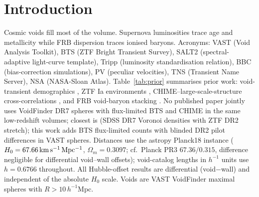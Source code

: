 \section{Introduction}
Cosmic voids fill most of the volume. Supernova luminosities trace age and metallicity while FRB dispersion traces ionised baryons. Acronyms: VAST (Void Analysis Toolkit), BTS (ZTF Bright Transient Survey), SALT2 (spectral-adaptive light-curve template), Tripp (luminosity standardisation relation), BBC (bias-correction simulations), PV (peculiar velocities), TNS (Transient Name Server), NSA (NASA-Sloan Atlas). Table~\ref{tab:prior} summarises prior work: void-transient demographics \citep{wang26,tsaprazi21}, ZTF Ia environments \citep{aubert25}, CHIME--large-scale-structure cross-correlations \citep{chime21}, and FRB void-baryon stacking \citep{sharma26}. No published paper jointly uses VoidFinder DR7 spheres \citep{douglass23} with flux-limited BTS \citep{perley20,fremling19} and CHIME in the same low-redshift volumes; closest is \citet{aubert25} (SDSS DR7 Voronoi densities with ZTF DR2 stretch); this work adds BTS flux-limited counts with blinded DR2 pilot differences in VAST spheres. Distances use the astropy Planck18 instance ($H_0=67.66\,{\rm km\,s^{-1}\,Mpc^{-1}}$, $\Omega_m=0.3097$; cf.\ Planck PR3 $67.36/0.315$, difference negligible for differential void--wall offsets); void-catalog lengths in $h^{-1}$ units use $h=0.6766$ throughout. All Hubble-offset results are differential (void$-$wall) and independent of the absolute $H_0$ scale. Voids are VAST VoidFinder maximal spheres with $R>10\,h^{-1}$Mpc.

